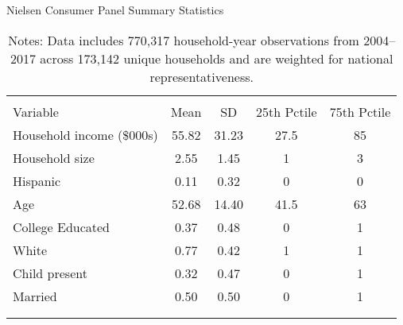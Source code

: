 \begin{table}[!htbp] \centering
\caption{Nielsen Consumer Panel Summary Statistics}
\label{tab:homescanSummaryStats}
\begin{tabular}{lcccc}
\\[-1.8ex]\hline
\hline \\[-1.8ex]
Variable                  & Mean  & SD    & 25th Pctile & 75th Pctile\\
\hline
Household income (\$000s) & 55.82 & 31.23 & 27.5        & 85 \\
Household size            & 2.55  & 1.45  & 1           & 3 \\
Hispanic                  & 0.11  & 0.32  & 0           & 0 \\
Age                       & 52.68 & 14.40 & 41.5        & 63 \\
College Educated          & 0.37  & 0.48  & 0           & 1 \\
White                     & 0.77  & 0.42  & 1           & 1\\
Child present             & 0.32  & 0.47  & 0           & 1\\
Married                   & 0.50  & 0.50  & 0           & 1\\
\\[-1.8ex]\hline
\hline \\[-1.8ex]
\end{tabular}
\caption*{Notes: Data includes 770,317 household-year observations from 2004--2017 across 173,142 unique households and are weighted for national representativeness.}
\end{table}

